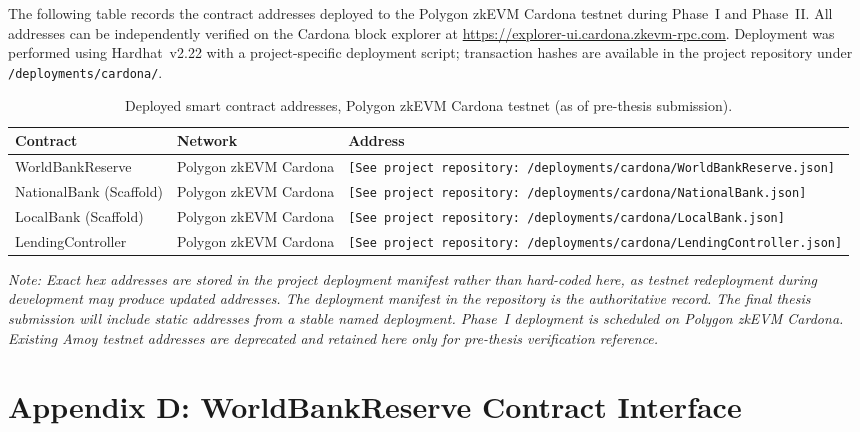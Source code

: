 \documentclass[12pt,a4paper]{report}
\newcommand{\tableheadcolor}{\rowcolor{black!8}}
\newcommand{\tableheadfont}{\bfseries\small}
\begin{document}
The following table records the contract addresses deployed to the Polygon zkEVM Cardona testnet during Phase~I and Phase~II. All addresses can be independently verified on the Cardona block explorer at \url{https://explorer-ui.cardona.zkevm-rpc.com}. Deployment was performed using Hardhat~v2.22 with a project-specific deployment script; transaction hashes are available in the project repository under \texttt{/deployments/cardona/}.

\begin{table}[H]
\centering
\caption{Deployed smart contract addresses, Polygon zkEVM Cardona testnet (as of pre-thesis submission).}
\renewcommand{\arraystretch}{1.35}
\small
\begin{tabular}{@{}llp{5.5cm}@{}}
\toprule
\tableheadcolor
\tableheadfont Contract & \tableheadfont Network & \tableheadfont Address \\
\midrule
WorldBankReserve & Polygon zkEVM Cardona & \texttt{[See project repository: /deployments/cardona/WorldBankReserve.json]} \\
\rowcolor{RowShade}
NationalBank (Scaffold) & Polygon zkEVM Cardona & \texttt{[See project repository: /deployments/cardona/NationalBank.json]} \\
LocalBank (Scaffold) & Polygon zkEVM Cardona & \texttt{[See project repository: /deployments/cardona/LocalBank.json]} \\
\rowcolor{RowShade}
LendingController & Polygon zkEVM Cardona & \texttt{[See project repository: /deployments/cardona/LendingController.json]} \\
\bottomrule
\end{tabular}
\end{table}

\noindent\textit{Note: Exact hex addresses are stored in the project deployment manifest rather than hard-coded here, as testnet redeployment during development may produce updated addresses. The deployment manifest in the repository is the authoritative record. The final thesis submission will include static addresses from a stable named deployment. Phase~I deployment is scheduled on Polygon zkEVM Cardona. Existing Amoy testnet addresses are deprecated and retained here only for pre-thesis verification reference.}


\chapter*{Appendix D: WorldBankReserve Contract Interface}
{}
\end{document}
